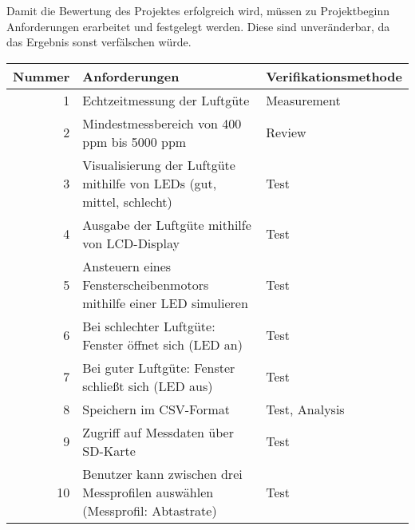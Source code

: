 \label{Anforderungen}

Damit die Bewertung des Projektes erfolgreich wird, müssen zu Projektbeginn Anforderungen erarbeitet und festgelegt werden. Diese sind unveränderbar, da das Ergebnis sonst verfälschen würde.

\begin{table}[!hbt]
	
	\centering
	
	\begin{tabular}{|r| p{8.4cm}|p{4.7cm}|}
		
		\hline
		Nummer & Anforderungen & Verifikationsmethode \\
		\hline
		1 & Echtzeitmessung der Luftgüte & Measurement \\
		\hline
		2 & Mindestmessbereich von 400 ppm bis 5000 ppm & Review \\
		\hline
		3 & Visualisierung der Luftgüte mithilfe von LEDs (gut, mittel, schlecht) & Test \\
		\hline
		4 & Ausgabe der Luftgüte mithilfe von LCD-Display & Test \\
		\hline
		5 & Ansteuern eines Fensterscheibenmotors mithilfe einer LED simulieren & Test \\
		\hline
		6 & Bei schlechter Luftgüte: Fenster öffnet sich (LED an) & Test \\
		\hline
		7 & Bei guter Luftgüte: Fenster schließt sich (LED aus) & Test \\
		\hline
		8 & Speichern im CSV-Format & Test, Analysis\\
		\hline
		9 & Zugriff auf Messdaten über SD-Karte & Test \\
		\hline
		10 & Benutzer kann zwischen drei Messprofilen auswählen (Messprofil: Abtastrate) & Test \\
		\hline
		
	\end{tabular}

\label{tab:Anforderungen}

\end{table}


